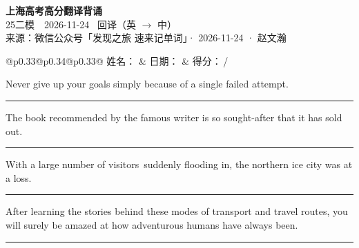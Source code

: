 \documentclass[11pt,a4paper]{article}
\newcommand{\num}[1]{\makebox[1.9em][r]{#1.}\hspace{0.3em}}
\newcommand{\wline}{\noindent\rule{\linewidth}{0.4pt}}
\begin{document}
\pagestyle{plain}
\begin{center}
{\LARGE\bfseries 上海高考高分翻译背诵 }\\[0.25em]
{\large 25二模　2026-11-24 \quad\ 回译（英 $\to$ 中）}\\[0.35em]
{\footnotesize 来源：微信公众号「发现之旅 速来记单词」· 2026-11-24 · 赵文瀚}
\end{center}

\vspace{0.4em}
\noindent\begin{tabular}{@{}p{0.33\textwidth}@{}p{0.34\textwidth}@{}p{0.33\textwidth}@{}}
姓名：\underline{\hspace{2.0cm}} & 日期：\underline{\hspace{2.0cm}} & 得分：\underline{\hspace{1.4cm}}\,/ \\
\end{tabular}

\vspace{0.5em}

\vspace{0.8em}
\num{1}Never give up your goals simply because of a single failed attempt.

\vspace{0.25em}

\wline

\num{2}The book recommended by the famous writer is so sought-after that it has sold out.

\vspace{0.25em}

\wline

\num{3}With a large number of visitors\ suddenly flooding in, the northern ice city was at a loss.

\vspace{0.25em}

\wline

\num{4}After learning the stories behind these modes of transport and travel routes, you will surely be amazed at how adventurous humans have always been.

\vspace{0.25em}

\wline
\end{document}
